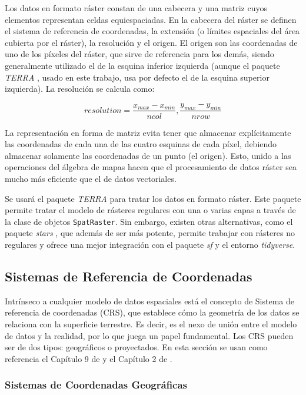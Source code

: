 \documentclass[12pt,a4paper,]{book}
\numberwithin{dummy}{section}
\theoremstyle{ocrenumbox}
\theoremstyle{blacknumex}
\theoremstyle{blacknumbox}
\theoremstyle{ocrenum}
\theoremstyle{ocrenum}
\begin{document}
Los datos en formato ráster constan de una cabecera y una matriz cuyos
elementos representan celdas equiespaciadas. En la cabecera del ráster
se definen el sistema de referencia de coordenadas, la extensión (o
límites espaciales del área cubierta por el ráster), la resolución y el
origen. El origen son las coordenadas de uno de los píxeles del ráster,
que sirve de referencia para los demás, siendo generalmente utilizado el
de la esquina inferior izquierda (aunque el paquete \emph{TERRA}
\citep{terrapackage}, usado en este trabajo, usa por defecto el de la
esquina superior izquierda). La resolución se calcula como:

\[ resolution = \frac{x_{max}-x_{min}}{ncol},\frac{y_{max}-y_{min}}{nrow} \]

La representación en forma de matriz evita tener que almacenar
explícitamente las coordenadas de cada una de las cuatro esquinas de
cada píxel, debiendo almacenar solamente las coordenadas de un punto (el
origen). Esto, unido a las operaciones del álgebra de mapas hacen que el
procesamiento de datos ráster sea mucho más eficiente que el de datos
vectoriales.

Se usará el paquete \emph{TERRA} para tratar los datos en formato
ráster. Este paquete permite tratar el modelo de rásteres regulares con
una o varias capas a través de la clase de objetos \texttt{SpatRaster}.
Sin embargo, existen otras alternativas, como el paquete \emph{stars}
\citep{starspackage}, que además de ser más potente, permite trabajar
con rásteres no regulares y ofrece una mejor integración con el paquete
\emph{sf} y el entorno \emph{tidyverse}.

\hypertarget{sistemas-de-referencia-de-coordenadas}{%
\subsection{Sistemas de Referencia de
Coordenadas}\label{sistemas-de-referencia-de-coordenadas}}

Intrínseco a cualquier modelo de datos espaciales está el concepto de
Sistema de referencia de coordenadas (CRS), que establece cómo la
geometría de los datos se relaciona con la superficie terrestre. Es
decir, es el nexo de unión entre el modelo de datos y la realidad, por
lo que juega un papel fundamental. Los CRS pueden ser de dos tipos:
geográficos o proyectados. En esta sección se usan como referencia el
Capítulo 9 de \citet{introGISGimond} y el Capítulo 2 de
\citet{lovelace_geocomputation_2019}.

\hypertarget{sistemas-de-coordenadas-geogruxe1ficas}{%
\subsubsection*{Sistemas de Coordenadas
Geográficas}\label{sistemas-de-coordenadas-geogruxe1ficas}}
\end{document}
